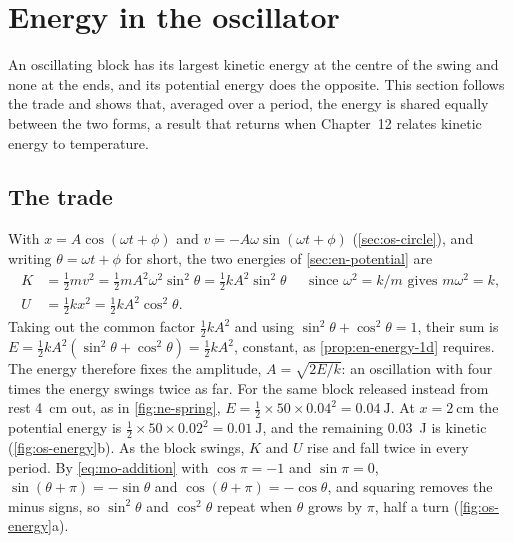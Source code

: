 \section{Energy in the oscillator}
\label{sec:os-energy}

An oscillating block has its largest kinetic energy at the centre of the
swing and none at the ends, and its potential energy does the opposite.
This section follows the trade and shows that, averaged over a period,
the energy is shared equally between the two forms, a result that
returns when Chapter~12 relates kinetic energy to temperature.

\subsection*{The trade}

With $x = A\cos(\omega t + \phi)$ and $v = -A\omega\sin(\omega t + \phi)$
(\cref{sec:os-circle}), and writing $\theta = \omega t + \phi$ for short,
the two energies of \cref{sec:en-potential} are
\begin{align*}
   K &= \tfrac12 m v^2 = \tfrac12 m A^2\omega^2\sin^2\theta
      = \tfrac12 k A^2\sin^2\theta
      && \text{since $\omega^2 = k/m$ gives $m\omega^2 = k$,}\\
   U &= \tfrac12 k x^2 = \tfrac12 k A^2\cos^2\theta .
\end{align*}
Taking out the common factor $\frac12 kA^2$ and using $\sin^2\theta +
\cos^2\theta = 1$, their sum is $E = \frac12 kA^2(\sin^2\theta +
\cos^2\theta) = \frac12 kA^2$, constant, as \cref{prop:en-energy-1d} requires. The energy
therefore fixes the amplitude, $A = \sqrt{2E/k}$: an oscillation with four
times the energy swings twice as far. For the same block
released instead from rest \SI{4}{\centi\metre} out, as in
\cref{fig:ne-spring}, $E =
\frac12\times50\times0.04^2 = \SI{0.04}{\joule}$. At $x =
\SI{2}{\centi\metre}$ the potential energy is $\frac12\times50\times0.02^2
= \SI{0.01}{\joule}$, and the remaining \SI{0.03}{\joule} is kinetic
(\cref{fig:os-energy}b). As the block swings, $K$ and $U$ rise and fall
twice in every period. By \cref{eq:mo-addition} with $\cos\pi = -1$ and
$\sin\pi = 0$, $\sin(\theta + \pi) = -\sin\theta$ and $\cos(\theta + \pi)
= -\cos\theta$, and squaring removes the minus signs, so $\sin^2\theta$
and $\cos^2\theta$ repeat when $\theta$ grows by $\pi$, half a turn
(\cref{fig:os-energy}a).

